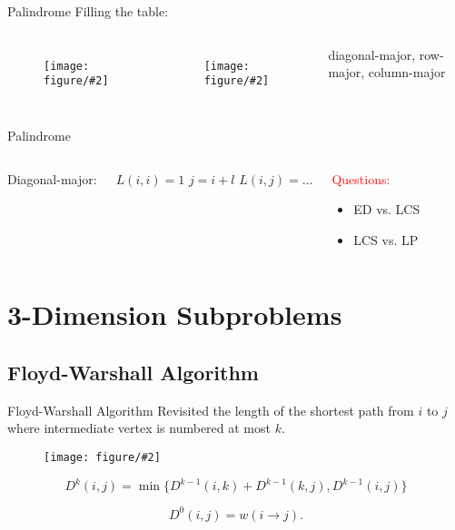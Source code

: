 \documentclass{beamer}
\newcommand{\fig}[2]
{
  \begin{figure}[htp]
	  \centering
	  \texttt{[image: figure/\#2]}
  \end{figure}
}
\begin{document}
\begin{frame}{Palindrome}
  Filling the table:
  \begin{columns}
    \fig{width = 0.95\textwidth}{palindromeorder}
    \fig{width = 0.90\textwidth}{threeorders}
    \begin{center}
      diagonal-major, row-major, column-major
    \end{center}
  \end{columns}
\end{frame}
\begin{frame}{Palindrome}
  \begin{columns}
	  Diagonal-major:
	  \vspace{0.20cm}
	  \begin{mdframed}
	  \begin{algorithmic}[1]
	      \State $L(i,i) = 1$
	    \EndFor
	    \Statex
	        \State $j = i + l$
	        \State $L(i,j) = \ldots$
	      \EndFor
	    \EndFor
	  \end{algorithmic}
	  \end{mdframed}
	\column{0.40\textwidth}
	  \begin{mdframed}
	    \textcolor{red}{Questions:} 
	    \begin{itemize}
	      \item ED vs. LCS
	      \item LCS vs. LP
	    \end{itemize}
	  \end{mdframed}
  \end{columns}
\end{frame}
\section{3-Dimension Subproblems}

\subsection{Floyd-Warshall Algorithm}

\begin{frame}{Floyd-Warshall Algorithm Revisited}
   the length of the shortest path from $i$
  to $j$ where intermediate vertex is numbered at most $k$.
  
  \begin{theorem}[Recurrence]
    \fig{width = 0.70\textwidth}{floyd-warshall-recursion}
    \[
      D^{k}(i,j) = \min \{ D^{k-1}(i,k) + D^{k-1}(k,j), D^{k-1}(i,j) \}
    \]
    
    \vspace{0.20cm}
    \[ D^{0}(i,j) = w(i \to j). \]
  \end{theorem}
\end{frame}
\end{document}

